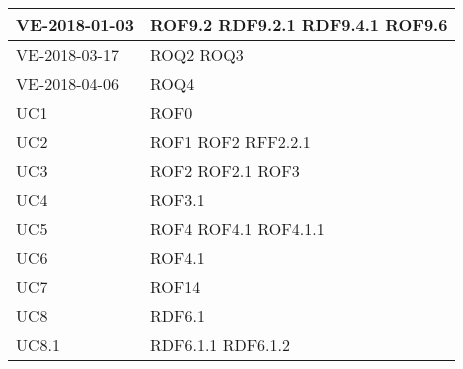 \documentclass[../AnalisideiRequisiti.tex]{subfiles}
\begin{document}
\begin{longtable}{| p{4cm} | p{4cm} |}
	\hline
		\newline VE-2018-01-03 & \newline ROF9.2 \newline RDF9.2.1 \newline RDF9.4.1 \newline ROF9.6 \\[1em]
	\hline
		\newline VE-2018-03-17 & \newline ROQ2 \newline ROQ3 \\[1em]
	\hline
		\newline VE-2018-04-06 & \newline ROQ4 \\[1em]	
		

	\hline
		\newline UC1 &  \newline ROF0 \\[1em]
	\hline
		\newline UC2 &  \newline ROF1 \newline ROF2 \newline RFF2.2.1   \\[1em]	
		\hline
		\newline UC3 &  \newline ROF2 \newline ROF2.1 \newline ROF3 \\[1em]	
		\hline
		\newline UC4 &  \newline ROF3.1 \\[1em]	
		\hline
		\newline UC5 &  \newline ROF4 \newline ROF4.1 \newline ROF4.1.1 \\[1em]
		\hline
		\newline UC6 &  \newline ROF4.1 \\[1em]
		\hline
		\newline UC7 &  \newline ROF14 \\[1em]
		\hline
		\newline UC8 &  \newline RDF6.1 \\[1em]
		\hline
		\newline UC8.1 &  \newline RDF6.1.1 \newline RDF6.1.2 \\[1em]

\end{longtable}
\end{document}
